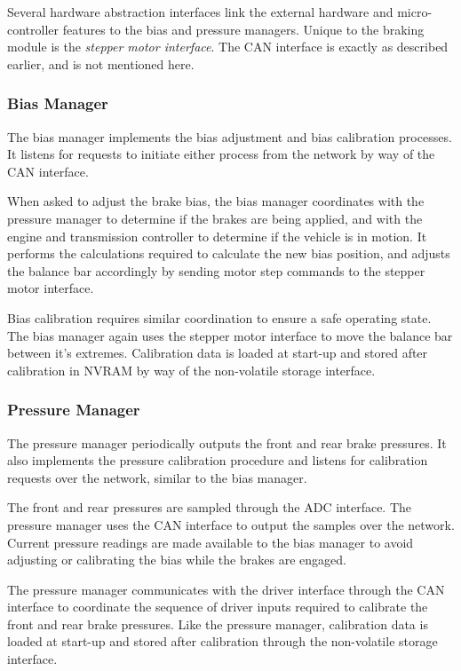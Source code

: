Several hardware abstraction interfaces link the external hardware and micro-controller features to the bias and pressure managers. Unique to the braking module is the \emph{stepper motor interface}. The CAN interface is exactly as described earlier, and is not mentioned here.

\subsubsection{Bias Manager}

The bias manager implements the bias adjustment and bias calibration processes. It listens for requests to initiate either process from the network by way of the CAN interface.

When asked to adjust the brake bias, the bias manager coordinates with the pressure manager to determine if the brakes are being applied, and with the engine and transmission controller to determine if the vehicle is in motion. It performs the calculations required to calculate the new bias position, and adjusts the balance bar accordingly by sending motor step commands to the stepper motor interface.

Bias calibration requires similar coordination to ensure a safe operating state. The bias manager again uses the stepper motor interface to move the balance bar between it's extremes. Calibration data is loaded at start-up and stored after calibration in NVRAM by way of the non-volatile storage interface.

\subsubsection{Pressure Manager}

The pressure manager periodically outputs the front and rear brake pressures. It also implements the pressure calibration procedure and listens for calibration requests over the network, similar to the bias manager.

The front and rear pressures are sampled through the ADC interface. The pressure manager uses the CAN interface to output the samples over the network. Current pressure readings are made available to the bias manager to avoid adjusting or calibrating the bias while the brakes are engaged.

The pressure manager communicates with the driver interface through the CAN interface to coordinate the sequence of driver inputs required to calibrate the front and rear brake pressures. Like the pressure manager, calibration data is loaded at start-up and stored after calibration through the non-volatile storage interface.

